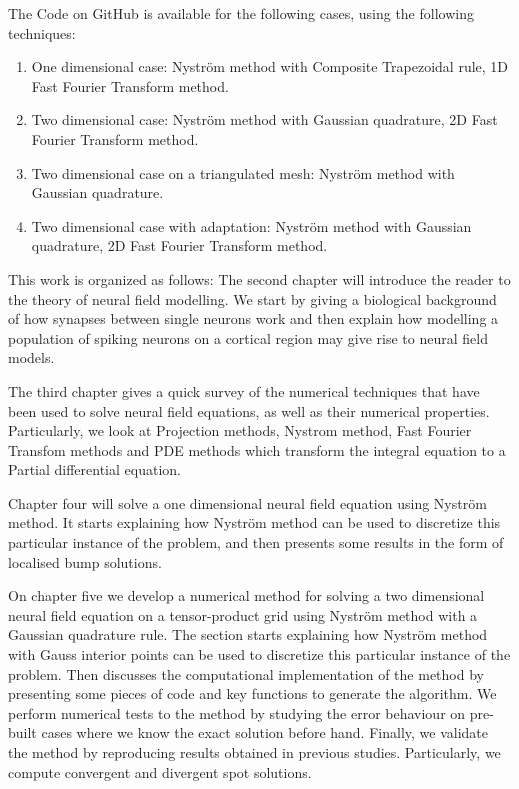 \documentclass{uonmathreport}
\begin{document}
The Code on GitHub is available for the following cases, using the following techniques:
\begin{enumerate}
	\itemsep-0.5em
	\item One dimensional case: Nystr\"om method with Composite Trapezoidal rule, 1D Fast Fourier Transform method.
	\item Two dimensional case: Nystr\"om method with Gaussian quadrature, 2D Fast Fourier Transform method.
	\item Two dimensional case on a triangulated mesh: Nystr\"om method with Gaussian quadrature.
	\item Two dimensional case with adaptation: Nystr\"om method with Gaussian quadrature, 2D Fast Fourier Transform method.
\end{enumerate}

This work is organized as follows: The second chapter will introduce the reader to the theory of neural field modelling. We start by giving a biological background of how synapses between single neurons work and then explain how modelling a population of spiking neurons on a cortical region may give rise to neural field models. 

The third chapter gives a quick survey of the numerical techniques that have been used to solve neural field equations, as well as their numerical properties. Particularly, we look at Projection methods, Nystrom method, Fast Fourier Transfom methods and PDE methods which transform the integral equation to a Partial differential equation. 

Chapter four will solve a one dimensional neural field equation using Nystr\"om method. It starts explaining how Nystr\"om method can be used to discretize this particular instance of the problem, and then presents some results in the form of localised bump solutions.

On chapter five we develop a numerical method for solving a two dimensional neural field equation on a tensor-product grid using Nystr\"om method with a Gaussian quadrature rule. The section starts explaining how Nystr\"om method with Gauss interior points can be used to discretize this particular instance of the problem. Then discusses the computational implementation of the method by presenting some pieces of code and key functions to generate the algorithm. We perform numerical tests to the method by studying the error behaviour on pre-built cases where we know the exact solution before hand. Finally, we validate the method by reproducing results obtained in previous studies. Particularly, we compute convergent and divergent spot solutions.
\end{document}
